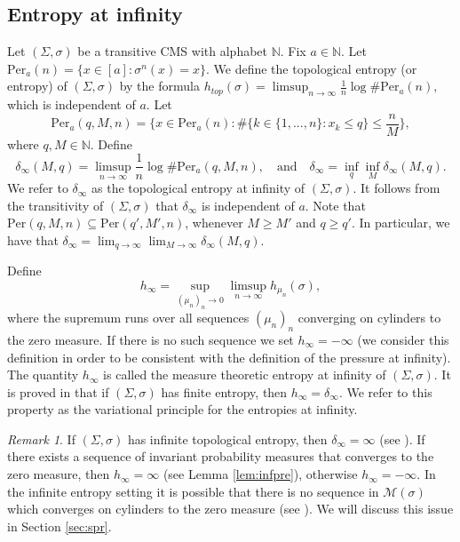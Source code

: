 \documentclass[letterpaper,11pt]{amsart}
\theoremstyle{plain}
\theoremstyle{plain}
\theoremstyle{definition}
\theoremstyle{remark}
\newtheorem{remark}{Remark}[section]
\def\N{{\mathbb N}}
\def\M{{\mathcal M}}
\begin{document}
\subsection{Entropy at infinity}\label{sec:entinf} Let $(\Sigma,\sigma)$ be a transitive CMS with alphabet $\N$. Fix $a\in \N$. Let $\text{Per}_a(n)=\{x\in[a]:\sigma^n(x)=x\}$. We define the topological entropy (or entropy) of $(\Sigma,\sigma)$ by the formula $h_{top}(\sigma)=\limsup_{n\to\infty} \frac{1}{n}\log \# \text{Per}_a(n),$ which is independent of $a$. Let
$$\text{Per}_a(q,M,n)=\big\{x\in  \text{Per}_a(n): \#\{k\in\{1,...,n\}:x_k\le q\}\le \frac{n}{M}\big\},$$ where $q,M\in\N$. Define
 $$\delta_\infty(M,q)=\limsup_{n\to\infty} \frac{1}{n}\log \# \text{Per}_a(q,M,n), \quad\text{and}\quad \delta_\infty=\inf_{q}\inf_{M} \delta_\infty(M,q).$$
We refer to $\delta_\infty$ as the topological entropy at infinity of $(\Sigma,\sigma)$. It follows from the transitivity of $(\Sigma,\sigma)$ that $\delta_\infty$ is independent of $a$. Note that $\text{Per}(q,M,n)\subseteq \text{Per}(q',M',n)$, whenever $M\ge M'$ and $q\ge q'$. In particular, we have that
$\delta_\infty=\lim_{q\to\infty}\lim_{M\to\infty} \delta_\infty(M,q).$

Define 
$$h_\infty=\sup_{(\mu_n)_n\to 0}\limsup_{n\to\infty}h_{\mu_n}(\sigma),$$
where the supremum runs over all sequences $(\mu_n)_n$ converging on cylinders to the zero measure. If there is no such sequence we set $h_\infty=-\infty$ (we consider this definition in order to be consistent with the definition of the pressure at infinity).  The quantity $h_\infty$ is called the measure theoretic entropy at infinity of $(\Sigma,\sigma)$. It is proved in \cite[Theorem 1.4]{itv} that if $(\Sigma,\sigma)$ has finite  entropy, then $h_\infty=\delta_\infty$. We refer to this property as the variational principle for the entropies at infinity. 

\begin{remark}\label{rem:infent} If $(\Sigma,\sigma)$ has infinite topological entropy, then $\delta_\infty=\infty$ (see \cite[Proposition 8.3]{itv}). If there exists a sequence of invariant probability measures that converges to the zero measure, then $h_\infty=\infty$ (see Lemma \ref{lem:infpre}), otherwise $h_\infty=-\infty$. In the infinite entropy setting it is possible that there is no sequence in $\M(\sigma)$ which converges on cylinders to the zero measure (see \cite[Example 4.17]{iv}). We will discuss this issue in Section \ref{sec:spr}. \end{remark}
\end{document}
